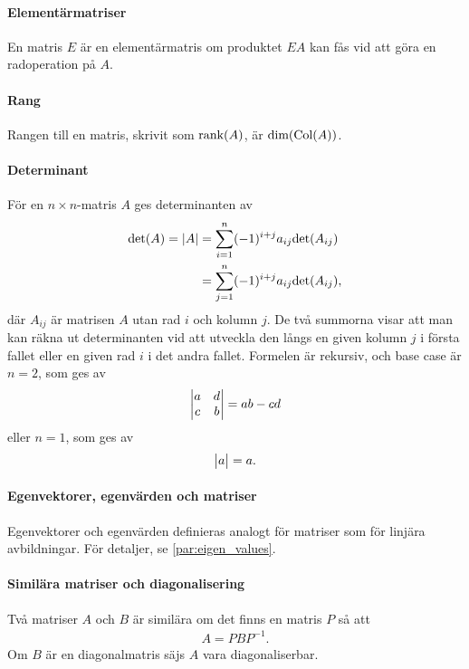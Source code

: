 \paragraph{Elementärmatriser}
En matris $E$ är en elementärmatris om produktet $EA$ kan fås vid att göra en radoperation på $A$.

\paragraph{Rang}
Rangen till en matris, skrivit som $\text{rank}(A)$, är $\text{dim}(\text{Col}(A))$.

\paragraph{Determinant}
För en $n\times n$-matris $A$ ges determinanten av
\begin{align*}
	\text{det}(A) = \abs{A} &= \sum\limits_{i = 1}^{n}(-1)^{i + j}a_{ij}\text{det}(A_{ij}) \\
	&= \sum\limits_{j = 1}^{n}(-1)^{i + j}a_{ij}\text{det}(A_{ij}),
\end{align*}
där $A_{ij}$ är matrisen $A$ utan rad $i$ och kolumn $j$. De två summorna visar att man kan räkna ut determinanten vid att utveckla den långs en given kolumn $j$ i första fallet eller en given rad $i$ i det andra fallet. Formelen är rekursiv, och base case är $n=2$, som ges av
\begin{align*}
	\mdet{a & d \\ c & b} = ab - cd
\end{align*}
eller $n = 1$, som ges av
\begin{align*}
	\mdet{a} = a.
\end{align*}

\paragraph{Egenvektorer, egenvärden och matriser}
Egenvektorer och egenvärden definieras analogt för matriser som för linjära avbildningar. För detaljer, se \ref{par:eigen_values}.

\paragraph{Similära matriser och diagonalisering}
Två matriser $A$ och $B$ är similära om det finns en matris $P$ så att
\begin{align*}
	A = PBP^{-1}.
\end{align*}
Om $B$ är en diagonalmatris säjs $A$ vara diagonaliserbar.

